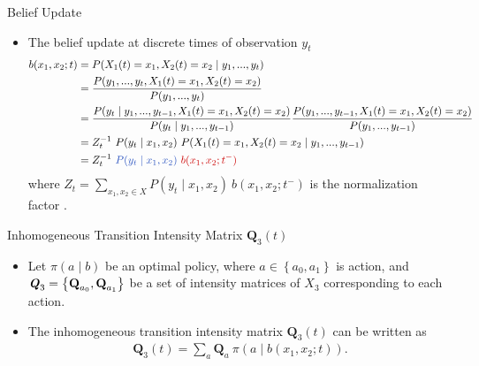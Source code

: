 \documentclass[
	english,%
	aspectratio=169,%
	color={accentcolor=3b},
	logo=true,%
	colorframetitle=false,%
	]{tudabeamer}
\begin{document}
\begin{frame}{Belief Update}
\begin{itemize}
	\item The belief update at discrete times of observation $ y_{t} $
	\begin{align}
	b(x_{1}, x_{2}; t) & = P( X_{1}(t) = x_{1},  X_{2}(t) = x_{2}\mid y_{1}, ..., y_{t}) \nonumber\\ & = \frac{P(y_{1}, ..., y_{t}, X_{1}(t) = x_{1},  X_{2}(t) = x_{2})}{P(y_{1}, ..., y_{t})}  \nonumber\\ & = \frac{P(y_{t} \mid y_{1}, ..., y_{t-1}, X_{1}(t) = x_{1},  X_{2}(t) = x_{2})}{P(y_{t} \mid y_{1}, ..., y_{t-1})} \frac{P(y_{1}, ..., y_{t-1}, X_{1}(t) = x_{1},  X_{2}(t) = x_{2})}{P(y_{1}, ..., y_{t-1})}  \nonumber\\ & = Z_{t}^{-1} \ P(y_{t} \mid x_{1}, x_{2})\ P( X_{1}(t) = x_{1},  X_{2}(t) = x_{2}\mid y_{1}, ..., y_{t-1})  \nonumber\\ & = Z_{t}^{-1}\ \textcolor[rgb]{0.16,0.32,0.75}{P(y_{t} \mid x_{1}, x_{2})}\ \textcolor[rgb]{0.8,0,0}{b(x_{1}, x_{2}; t^{-})}
	\end{align}
	where $ Z_{t} = \sum_{x_{1}, x_{2}\in X} P(y_{t} \mid x_{1}, x_{2})\ b(x_{1}, x_{2}; t^{-}) $ is the normalization factor \cite{article}.
\end{itemize}
\end{frame}


\begin{frame}{Inhomogeneous Transition Intensity Matrix $ \textbf{Q}_{3}(t)$}
\begin{itemize}
	\item Let $ \pi(a \mid b) $ be an optimal policy, where $ a \in \left\lbrace a_{0}, a_{1}\right\rbrace  $ is action, and $ \textbf{\textit{Q}}_{3} = \left\lbrace \textbf{Q}_{a_{0}}, \textbf{Q}_{a_{1}} \right\rbrace  $ be a set of intensity matrices of $ X_{3} $ corresponding to each action.
	\item The inhomogeneous transition intensity matrix $ \textbf{Q}_{3}(t) $ can be written as
	\begin{equation}
	\begin{split}
	\textbf{Q}_{3}(t) = \sum_{a} \textbf{Q}_{a}\ \pi(a \mid b(x_{1}, x_{2};t)).
	\end{split}
	\label{eq.Q3}
	\end{equation}
\end{itemize}
\end{frame}
\end{document}
